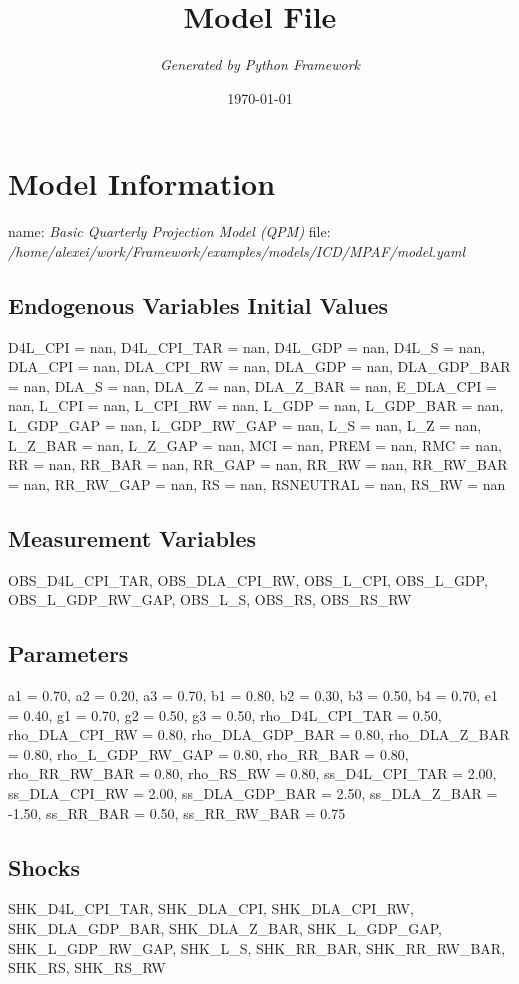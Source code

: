 \documentclass{article}%
\title{\textbf{Model File}}%
\author{\textit{Generated by Python Framework}}%
\date{\today}%
\begin{document}
%
\normalsize%
\maketitle%
\section{Model Information}%
\label{sec:ModelInformation}%
name: %
\textit{Basic Quarterly Projection Model (QPM)}%
\newline%
file: %
\textit{/home/alexei/work/Framework/examples/models/ICD/MPAF/model.yaml}%
\subsection{Endogenous Variables Initial Values}%
\label{subsec:EndogenousVariablesInitialValues}%
D4L\_CPI = nan, D4L\_CPI\_TAR = nan, D4L\_GDP = nan, D4L\_S = nan, DLA\_CPI = nan, DLA\_CPI\_RW = nan, DLA\_GDP = nan, DLA\_GDP\_BAR = nan, DLA\_S = nan, DLA\_Z = nan, DLA\_Z\_BAR = nan, E\_DLA\_CPI = nan, L\_CPI = nan, L\_CPI\_RW = nan, L\_GDP = nan, L\_GDP\_BAR = nan, L\_GDP\_GAP = nan, L\_GDP\_RW\_GAP = nan, L\_S = nan, L\_Z = nan, L\_Z\_BAR = nan, L\_Z\_GAP = nan, MCI = nan, PREM = nan, RMC = nan, RR = nan, RR\_BAR = nan, RR\_GAP = nan, RR\_RW = nan, RR\_RW\_BAR = nan, RR\_RW\_GAP = nan, RS = nan, RSNEUTRAL = nan, RS\_RW = nan

%
\subsection{Measurement Variables}%
\label{subsec:MeasurementVariables}%
OBS\_D4L\_CPI\_TAR, OBS\_DLA\_CPI\_RW, OBS\_L\_CPI, OBS\_L\_GDP, OBS\_L\_GDP\_RW\_GAP, OBS\_L\_S, OBS\_RS, OBS\_RS\_RW

%
\subsection{Parameters}%
\label{subsec:Parameters}%
a1 = 0.70, a2 = 0.20, a3 = 0.70, b1 = 0.80, b2 = 0.30, b3 = 0.50, b4 = 0.70, e1 = 0.40, g1 = 0.70, g2 = 0.50, g3 = 0.50, rho\_D4L\_CPI\_TAR = 0.50, rho\_DLA\_CPI\_RW = 0.80, rho\_DLA\_GDP\_BAR = 0.80, rho\_DLA\_Z\_BAR = 0.80, rho\_L\_GDP\_RW\_GAP = 0.80, rho\_RR\_BAR = 0.80, rho\_RR\_RW\_BAR = 0.80, rho\_RS\_RW = 0.80, ss\_D4L\_CPI\_TAR = 2.00, ss\_DLA\_CPI\_RW = 2.00, ss\_DLA\_GDP\_BAR = 2.50, ss\_DLA\_Z\_BAR = {-}1.50, ss\_RR\_BAR = 0.50, ss\_RR\_RW\_BAR = 0.75

%
\subsection{Shocks}%
\label{subsec:Shocks}%
SHK\_D4L\_CPI\_TAR, SHK\_DLA\_CPI, SHK\_DLA\_CPI\_RW, SHK\_DLA\_GDP\_BAR, SHK\_DLA\_Z\_BAR, SHK\_L\_GDP\_GAP, SHK\_L\_GDP\_RW\_GAP, SHK\_L\_S, SHK\_RR\_BAR, SHK\_RR\_RW\_BAR, SHK\_RS, SHK\_RS\_RW
\end{document}
